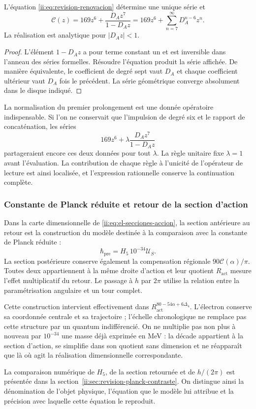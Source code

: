 \begin{proposition}
L'équation \eqref{ii:eq:revision-renovacion} détermine une unique série et
\[
 \mathscr C(z)=169z^6+\frac{D_Az^7}{1-D_Az}
             =169z^6+\sum_{n=7}^{\infty}D_A^{n-6}z^n.
\]
La réalisation est analytique pour \(|D_Az|<1\).
\end{proposition}
\begin{proof}
L'élément \(1-D_Az\) a pour terme constant un et est inversible
dans l'anneau des séries formelles. Résoudre l'équation produit la série
affichée. De manière équivalente, le coefficient de degré sept vaut \(D_A\)
et chaque coefficient ultérieur vaut \(D_A\) fois le précédent. La série
géométrique converge absolument dans le disque indiqué.
\end{proof}

La normalisation du premier prolongement est une donnée opératoire
indispensable. Si l'on ne conservait que l'impulsion de degré six et
le rapport de concaténation, les séries
\[
 169z^6+\lambda\frac{D_Az^7}{1-D_Az}
\]
partageraient encore ces deux données pour tout \(\lambda\).
La règle unitaire fixe \(\lambda=1\) avant l'évaluation.
La contribution de chaque règle à l'unicité de l'opérateur de lecture
est ainsi localisée, et l'expression rationnelle conserve la continuation complète.

\subsubsection{Constante de Planck réduite et retour de la section d'action}

Dans la carte dimensionnelle de \eqref{ii:eq:el-secciones-accion}, la section
antérieure au retour est la construction du modèle destinée à la comparaison
avec la constante de Planck réduite :
\[
 \hbar_{\mathrm{pre}}=H_5\,10^{-34}\mathcal U_S.
\]
La section postérieure conserve également la compensation régionale
\(90\mathscr C(\alpha)/\pi\). Toutes deux appartiennent à la même droite
d'action et leur quotient \(R_{\mathrm{act}}\) mesure l'effet multiplicatif
du retour. Le passage à \(h\) par \(2\pi\) utilise la relation
entre la paramétrisation angulaire et un tour complet.

Cette construction intervient effectivement dans
\(R_{\mathrm{act}}^{80-54\alpha+6\Delta_4}\). L'électron conserve
sa coordonnée centrale et sa trajectoire ; l'échelle chronologique ne
remplace pas cette structure par un quantum indifférencié. On ne
multiplie pas non plus à nouveau par \(10^{-34}\) une masse déjà exprimée en MeV :
la décade appartient à la section d'action, se simplifie dans son quotient
sans dimension et ne réapparaît que là où agit la réalisation
dimensionnelle correspondante.

La comparaison numérique de \(H_5\), de la section retournée et de
\(h/(2\pi)\) est présentée dans la section~\ref{ii:sec:revision-planck-contraste}.
On distingue ainsi la dénomination de l'objet physique, l'équation que le
modèle lui attribue et la précision avec laquelle cette équation le reproduit.



